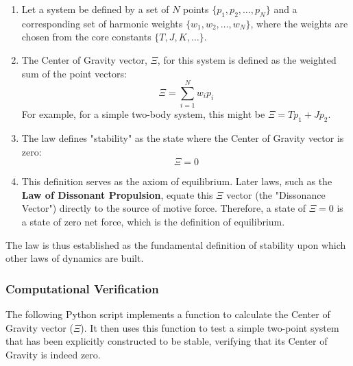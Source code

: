 \begin{enumerate}
    \item Let a system be defined by a set of $N$ points $\{p_1, p_2, \dots, p_N\}$ and a corresponding set of harmonic weights $\{w_1, w_2, \dots, w_N\}$, where the weights are chosen from the core constants $\{T, J, K, \dots\}$.

    \item The Center of Gravity vector, $\Xi$, for this system is defined as the weighted sum of the point vectors:
    $$ \Xi = \sum_{i=1}^{N} w_i p_i $$
    For example, for a simple two-body system, this might be $\Xi = T p_1 + J p_2$.

    \item The law defines "stability" as the state where the Center of Gravity vector is zero:
    $$ \Xi = 0 $$
    
    \item This definition serves as the axiom of equilibrium. Later laws, such as the \textbf{Law of Dissonant Propulsion}, equate this $\Xi$ vector (the "Dissonance Vector") directly to the source of motive force. Therefore, a state of $\Xi = 0$ is a state of zero net force, which is the definition of equilibrium.
\end{enumerate}
The law is thus established as the fundamental definition of stability upon which other laws of dynamics are built.

\subsubsection*{Computational Verification}
The following Python script implements a function to calculate the Center of Gravity vector ($\Xi$). It then uses this function to test a simple two-point system that has been explicitly constructed to be stable, verifying that its Center of Gravity is indeed zero.

